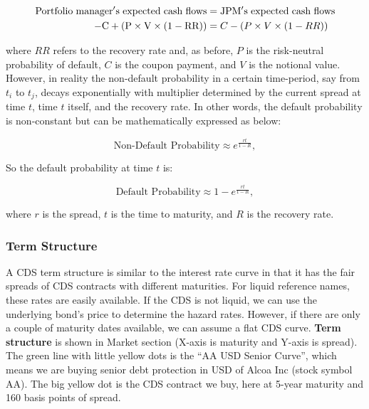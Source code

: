\documentclass{jss}
\begin{document}
\label{eqn:recovery}
\begin{align}
  \rm Portfolio\hspace{3pt}manager's\hspace{3pt}expected\hspace{3pt}cash\hspace{3pt}flows &= \rm JPM's\hspace{3pt}expected\hspace{3pt}cash\hspace{3pt}flows \\
  \rm - C + (P \times V \times (1 - RR)) &= C - (P \times V \times (1 - RR))
\end{align}

where $RR$ refers to the recovery rate and, as before, $P$ is the risk-neutral probability of default, $C$ is the coupon payment, and $V$ is the notional value. However, in reality the non-default probability in a certain time-period, say from $t_i$ to $t_j$, decays exponentially with multiplier determined by the current spread at time $t$, time $t$ itself, and the recovery rate. In other words, the default probability is non-constant but can be mathematically expressed as below:

\begin{equation}
  \text{Non-Default Probability} \approx e ^ {\frac{rt}{1-R}}, 
\end{equation}

So the default probability at time $t$ is:

\begin{equation}
  \text{Default Probability} \approx 1 - e ^ {\frac{rt}{1-R}}, \nonumber
\end{equation}

where $r$ is the spread, $t$ is the time to maturity, and $R$ is the recovery rate. 

\subsubsection{Term Structure}

A CDS term structure is similar to the interest rate curve in that it has the fair spreads of CDS contracts with different maturities. For liquid reference names, these rates are easily available. If the CDS is not liquid, we can use the underlying bond's price to determine the hazard rates. However, if there are only a couple of maturity dates available, we can assume a flat CDS curve. \textbf{Term structure} is shown in Market section (X-axis is maturity and Y-axis is spread). The green line with little yellow dots is the ``AA USD Senior Curve'', which means we are buying senior debt protection in USD of Alcoa Inc (stock symbol AA). The big yellow dot is the CDS contract we buy, here at 5-year maturity and 160 basis points of spread.
\end{document}

